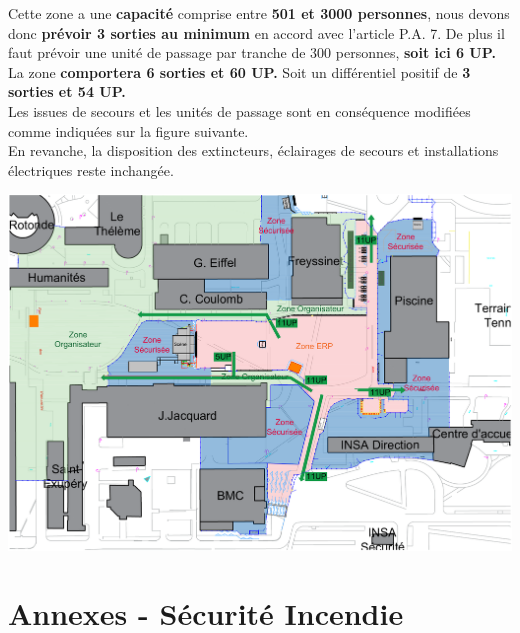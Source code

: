 \documentclass[hidelinks, paper=a4, fontsize=13pt]{report}
\begin{document}
Cette zone a une \textbf{capacité} comprise entre \textbf{501 et 3000 personnes}, nous devons donc \textbf{prévoir 3 sorties au minimum} en accord avec l’article P.A. 7. De plus il faut prévoir une unité de passage par tranche de 300 personnes, \textbf{soit ici 6 UP.}\\

La zone \textbf{comportera 6 sorties et 60 UP.} Soit un différentiel positif de \textbf{3 sorties et 54 UP.}\\
					
Les issues de secours et les unités de passage sont en conséquence modifiées comme indiquées sur la figure suivante.\\

En revanche, la disposition des extincteurs, éclairages de secours et installations électriques reste inchangée.\\

\begin{center}
\includegraphics[width=\textwidth,keepaspectratio, angle=90]{Exports/Plan_24h_44eme-Dimanche_IS}
\end{center}

\newpage

\section{Annexes - Sécurité Incendie}
\end{document}
